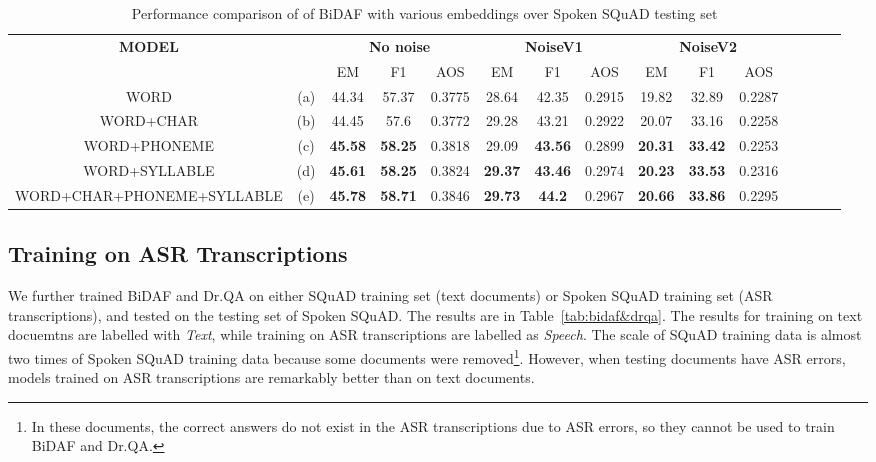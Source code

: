 \documentclass[a4paper]{article}
\begin{document}
\begin{table*}[]
\centering
\caption{Performance comparison of of BiDAF with various embeddings over Spoken SQuAD testing set}
\label{tab:BIDAF}
\begin{tabular}{|c|c|c|c|c|c|c|c|c|c|c|c|c|c|c|}
\hline
\multicolumn{1}{|c|}{\multirow{2}{*}{\textbf{MODEL}}} &
\multicolumn{1}{|c|}{\multirow{2}{*}{\textbf{}}} &
\multicolumn{3}{|c|}{\textbf{No noise}} & \multicolumn{3}{|c|}{\textbf{NoiseV1}} & \multicolumn{3}{|c|}{\textbf{NoiseV2}} \\
 \cline{3-5}\cline{6-8}\cline{9-11}
\multicolumn{1}{|c|}{} & \multicolumn{1}{|c|}{} & EM & F1 & AOS & EM & F1 & AOS & EM & F1 & AOS \\
\hline
\hline
 WORD & (a) &44.34 & 57.37 & 0.3775 & 28.64 & 42.35 & 0.2915 & 19.82 &32.89 & 0.2287\\
  WORD+CHAR & (b) & 44.45 & 57.6 & 0.3772 & 29.28 &43.21 & 0.2922 & 20.07 & 33.16 & 0.2258 \\
 WORD+PHONEME & (c) &\textbf{45.58} & \textbf{58.25}& 0.3818 & 29.09 & \textbf{43.56}& 0.2899 & \textbf{20.31} & \textbf{33.42}& 0.2253\\
  WORD+SYLLABLE & (d)  &\textbf{45.61} & \textbf{58.25} & 0.3824 & \textbf{29.37} & \textbf{43.46} & 0.2974 & \textbf{20.23} & \textbf{33.53} & 0.2316\\
\hline
 WORD+CHAR+PHONEME+SYLLABLE & (e) & \textbf{45.78} & \textbf{58.71}& 0.3846 & \textbf{29.73} & \textbf{44.2}& 0.2967 & \textbf{20.66} & \textbf{33.86}& 0.2295 \\
\hline
\end{tabular}
\end{table*}   

\subsection{Training on ASR Transcriptions}
We further trained BiDAF and Dr.QA on either  SQuAD training set (text documents) or Spoken SQuAD training set (ASR transcriptions), and tested on the testing set of Spoken SQuAD. 
The results are in Table~\ref{tab:bidaf&drqa}. 
The results for training on text docuemtns are labelled with  \textit{Text}, while training on ASR transcriptions are labelled as \textit{Speech}.
The scale of SQuAD training data is almost two times of Spoken SQuAD training data because some documents were removed\footnote{In these documents, the correct answers do not exist in the ASR transcriptions due to ASR errors, so they cannot be used to train BiDAF and Dr.QA.}. 
However, when testing documents have ASR errors,   models trained on ASR transcriptions are remarkably better than on text documents. 
\end{document}
